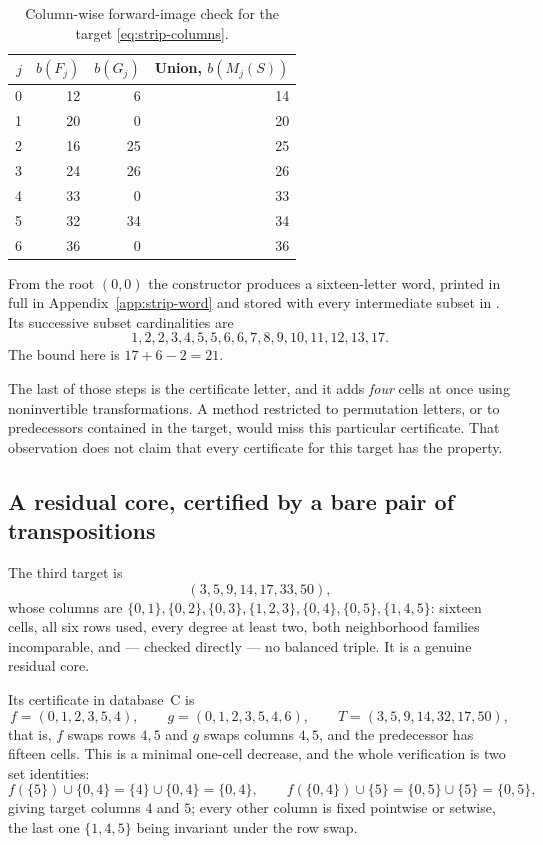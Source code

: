\documentclass[11pt,letterpaper]{article}
\numberwithin{equation}{section}
\theoremstyle{definition}
\theoremstyle{remark}
\newcommand{\code}[1]{\texttt{\detokenize{#1}}}
\newcommand{\dbC}{\textsf{C}}
\begin{document}
\begin{table}[H]
\centering
\caption{Column-wise forward-image check for the target
\eqref{eq:strip-columns}.}
\label{tab:strip-image}
\begin{tabular}{rrrr}
\toprule
$j$ & $b(F_j)$ & $b(G_j)$ & Union, $b(M_j(S))$\\
\midrule
0 & 12 & 6 & 14 \\
1 & 20 & 0 & 20 \\
2 & 16 & 25 & 25 \\
3 & 24 & 26 & 26 \\
4 & 33 & 0 & 33 \\
5 & 32 & 34 & 34 \\
6 & 36 & 0 & 36 \\
\bottomrule
\end{tabular}
\end{table}

From the root $(0,0)$ the constructor produces a sixteen-letter word, printed
in full in Appendix~\ref{app:strip-word} and stored with every intermediate
subset in \code{data/strip\_example\_6x7\_word.json}. Its successive subset
cardinalities are
\[
 1,2,2,3,4,5,5,6,6,7,8,9,10,11,12,13,17 .
\]
The bound here is $17+6-2=21$.

The last of those steps is the certificate letter, and it adds \emph{four}
cells at once using noninvertible transformations. A method restricted to
permutation letters, or to predecessors contained in the target, would miss
this particular certificate. That observation does not claim that every
certificate for this target has the property.

\subsection{A residual core, certified by a bare pair of transpositions}
\label{sec:ex-residual}
The third target is
\begin{equation}\label{eq:residual-columns}
 (3,5,9,14,17,33,50),
\end{equation}
whose columns are $\{0,1\},\{0,2\},\{0,3\},\{1,2,3\},\{0,4\},\{0,5\},
\{1,4,5\}$: sixteen cells, all six rows used, every degree at least two,
both neighborhood families incomparable, and --- checked directly --- no
balanced triple. It is a genuine residual core.

Its certificate in database~\dbC{} is
\[
 f=(0,1,2,3,5,4),\qquad
 g=(0,1,2,3,5,4,6),\qquad
 T=(3,5,9,14,32,17,50),
\]
that is, $f$ swaps rows $4,5$ and $g$ swaps columns $4,5$, and the
predecessor has fifteen cells. This is a minimal one-cell decrease, and the
whole verification is two set identities:
\[
 f(\{5\})\cup\{0,4\}=\{4\}\cup\{0,4\}=\{0,4\},
 \qquad
 f(\{0,4\})\cup\{5\}=\{0,5\}\cup\{5\}=\{0,5\},
\]
giving target columns $4$ and $5$; every other column is fixed pointwise or
setwise, the last one $\{1,4,5\}$ being invariant under the row swap.
\end{document}
